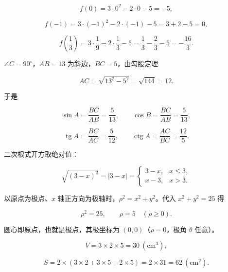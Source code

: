 \begin{answer}
\nopagebreak[4]
\[
f(0)=3\cdot 0^2-2\cdot 0-5=-5,
\]

\nopagebreak[4]
\[
f(-1)=3\cdot(-1)^2-2\cdot(-1)-5=3+2-5=0,
\]

\nopagebreak[4]
\[
f\left(\frac13\right)=3\cdot\frac19-2\cdot\frac13-5=\frac13-\frac23-5=-\frac{16}{3}.
\]


$\angle C=90^\circ$，$AB=13$ 为斜边，$BC=5$，由勾股定理

\nopagebreak[4]
\[
AC=\sqrt{13^2-5^2}=\sqrt{144}=12.
\]

于是

\nopagebreak[4]
\[
\sin A=\frac{BC}{AB}=\frac5{13},\qquad
\cos B=\frac{BC}{AB}=\frac5{13},
\]

\nopagebreak[4]
\[
\operatorname{tg}A=\frac{BC}{AC}=\frac5{12},\qquad
\operatorname{ctg}A=\frac{AC}{BC}=\frac{12}{5}.
\]


二次根式开方取绝对值：

\nopagebreak[4]
\[
\sqrt{(3-x)^2}=\left|3-x\right|
=\begin{cases}
3-x, & x\le 3,\\
x-3, & x>3.
\end{cases}
\]


以原点为极点、$x$ 轴正方向为极轴时，$\rho^2=x^2+y^2$。代入 $x^2+y^2=25$ 得

\nopagebreak[4]
\[
\rho^2=25,
\qquad
\rho=5\quad(\rho\ge 0).
\]

圆心即原点，也就是极点，其极坐标为 $(0,0)$（$\rho=0$，极角 $\theta$ 任意）。


\nopagebreak[4]
\[
V=3\times 2\times 5=30\ (\mathrm{cm^3}),
\]

\nopagebreak[4]
\[
S=2\times(3\times 2+3\times 5+2\times 5)=2\times 31=62\ (\mathrm{cm^2}).
\]






\end{answer}
